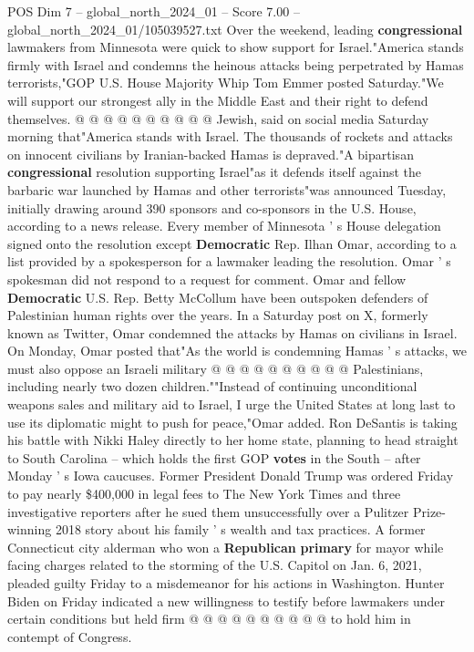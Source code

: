 \begin{textsample}{POS Dim 7 – global\_north\_2024\_01 – Score 7.00 – global\_north\_2024\_01/105039527.txt}
Over the weekend, leading \textbf{congressional} lawmakers from Minnesota were quick to show support for Israel."America stands firmly with Israel and condemns the heinous attacks being perpetrated by Hamas terrorists,"GOP U.S.
House Majority Whip Tom Emmer posted Saturday."We will support our strongest ally in the Middle East and their right to defend themselves. @ @ @ @ @ @ @ @ @ @ Jewish, said on social media Saturday morning that"America stands with Israel.
The thousands of rockets and attacks on innocent civilians by Iranian-backed Hamas is depraved."A bipartisan \textbf{congressional} resolution supporting Israel"as it defends itself against the barbaric war launched by Hamas and other terrorists"was announced Tuesday, initially drawing around 390 sponsors and co-sponsors in the U.S.
House, according to a news release.
Every member of Minnesota ' s House delegation signed onto the resolution except \textbf{Democratic} Rep.
Ilhan Omar, according to a list provided by a spokesperson for a lawmaker leading the resolution.
Omar ' s spokesman did not respond to a request for comment.
Omar and fellow \textbf{Democratic} U.S.
Rep.
Betty McCollum have been outspoken defenders of Palestinian human rights over the years.
In a Saturday post on X, formerly known as Twitter, Omar condemned the attacks by Hamas on civilians in Israel.
On Monday, Omar posted that"As the world is condemning Hamas ' s attacks, we must also oppose an Israeli military @ @ @ @ @ @ @ @ @ @ Palestinians, including nearly two dozen children.""Instead of continuing unconditional weapons sales and military aid to Israel, I urge the United States at long last to use its diplomatic might to push for peace,"Omar added.
Ron DeSantis is taking his battle with Nikki Haley directly to her home state, planning to head straight to South Carolina -- which holds the first GOP \textbf{votes} in the South -- after Monday ' s Iowa caucuses.
Former President Donald Trump was ordered Friday to pay nearly \$400,000 in legal fees to The New York Times and three investigative reporters after he sued them unsuccessfully over a Pulitzer Prize-winning 2018 story about his family ' s wealth and tax practices.
A former Connecticut city alderman who won a \textbf{Republican} \textbf{primary} for mayor while facing charges related to the storming of the U.S.
Capitol on Jan. 6, 2021, pleaded guilty Friday to a misdemeanor for his actions in Washington.
Hunter Biden on Friday indicated a new willingness to testify before lawmakers under certain conditions but held firm @ @ @ @ @ @ @ @ @ @ to hold him in contempt of Congress.

\end{textsample}
